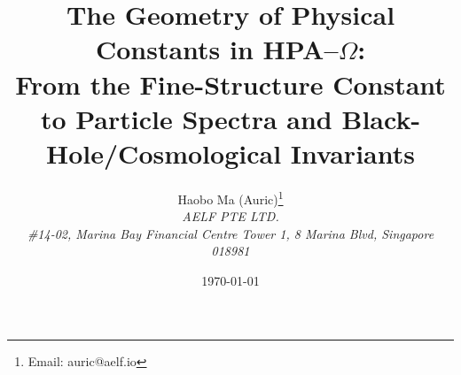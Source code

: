 \documentclass[11pt,a4paper]{article}
\title{The Geometry of Physical Constants in HPA--\texorpdfstring{$\Omega$}{Omega}:\\ From the Fine-Structure Constant to Particle Spectra and Black-Hole/Cosmological Invariants}
\author{Haobo Ma (Auric)\thanks{Email: auric@aelf.io} \\
\textit{AELF PTE LTD.} \\
\textit{\#14-02, Marina Bay Financial Centre Tower 1, 8 Marina Blvd, Singapore 018981}}
\date{\today}
\begin{document}
\maketitle















\FloatBarrier
\appendix


\FloatBarrier

\end{document}
